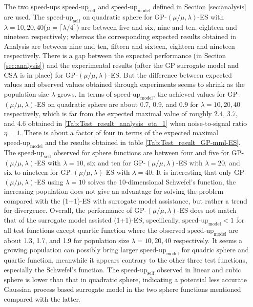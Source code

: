 The two speed-ups $\text{speed-up}_{\text{self}}$ and $\text{speed-up}_{\text{model}}$ defined in Section \ref{sec:analysis} are used.  The $\text{speed-up}_{\text{self}}$ on quadratic sphere for GP-$(\mu/\mu,\lambda)$-ES with $\lambda=10,20,40$($\mu = \lceil \lambda/4 \rceil $) are between five and six, nine and ten, eighteen and nineteen respectively; whereas the corresponding expected results obtained in Analysis are between nine and ten, fifteen and sixteen, eighteen and nineteen respectively. There is a gap between the expected performance (in Section \ref{sec:analysis}) and the experimental results (after the GP surrogate model and CSA is in place) for GP-$(\mu/\mu,\lambda)$-ES. But the difference between expected values and observed values obtained through experiments seems to shrink as the population size $\lambda$ grows. In terms of $\text{speed-up}_{\text{model}}$, the achieved values for GP-$(\mu/\mu,\lambda)$-ES on quadratic sphere are about 0.7, 0.9, and 0.9 for $\lambda=10,20,40$ respectively, which is far from the expected maximal value of roughly 2.4, 3.7, and 4.6 obtained in \ref{Tab:Test_result_analysis_eta_1} when noise-to-signal ratio $\eta=1$. There is about a factor of four in terms of the expected maximal $\text{speed-up}_{\text{model}}$ and the results obtained in table \ref{Tab:Test_result_GP-mml-ES}. The $\text{speed-up}_{\text{self}}$ observed for sphere functions are between four and five for GP-$(\mu/\mu,\lambda)$-ES with $\lambda=10$, six and ten for GP-$(\mu/\mu,\lambda)$-ES with $\lambda=20$, and six to nineteen for GP-$(\mu/\mu,\lambda)$-ES with $\lambda=40$. It is interesting that only GP-$(\mu/\mu,\lambda)$-ES using $\lambda=10$ solves the 10-dimensional Schwefel's function, the increasing population does not give an advantage for solving the problem compared with the (1+1)-ES with surrogate model assistance, but rather a trend for divergence. Overall, the performance of GP-$(\mu/\mu,\lambda)$-ES does not match that of the surrogate model assisted (1+1)-ES, specifically, $\text{speed-up}_{\text{model}}<1$ for all test functions except quartic function where the observed $\text{speed-up}_{\text{model}}$ are about 1.3, 1.7, and 1.9 for population size $\lambda=10,20,40$ respectively. It seems a growing population can possibly bring larger $\text{speed-up}_{\text{model}}$ for quadric sphere and quartic function, meanwhile it appears contrary to the other three test functions, especially the Schwefel's function. The $\text{speed-up}_{\text{self}}$ observed in linear and cubic sphere is lower than that in quadratic sphere, indicating a potential less accurate Gaussian process based surrogate model in the two sphere functions mentioned compared with the latter. 


